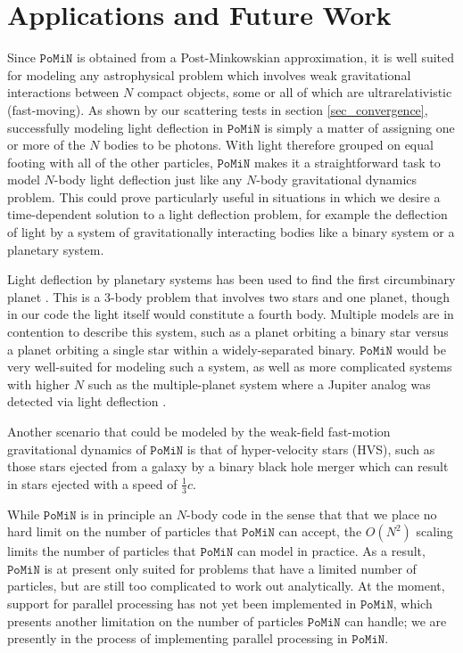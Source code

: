\documentclass[aps,onecolumn,notitlepage,eqsecnum,nofootinbib,floatfix,superscriptaddress]{revtex4-1}
\newcommand{\codename}{\mathtt{PoMiN}}
\begin{document}
\section{Applications and Future Work}
Since $\codename$ is obtained from a Post-Minkowskian approximation, it is well suited for modeling any astrophysical problem which involves weak gravitational interactions between $N$ compact objects, some or all of which are ultrarelativistic (fast-moving). As shown by our scattering tests in section \ref{sec_convergence}, successfully modeling light deflection in $\codename$ is simply a matter of assigning one or more of the $N$ bodies to be photons.  With light therefore grouped on equal footing with all of the other particles, $\codename$ makes it a straightforward task to model $N$-body light deflection just like any $N$-body gravitational dynamics problem.  This could prove particularly useful in situations in which we desire a time-dependent solution to a light deflection problem, for example the deflection of light by a system of gravitationally interacting bodies like a binary system or a planetary system.  

Light deflection by planetary systems has been used to find the first circumbinary planet \cite{circumbinary_planet}.  This is a 3-body problem that involves two stars and one planet, though in our code the light itself would constitute a fourth body.  Multiple models are in contention to describe this system, such as a planet orbiting a binary star versus a planet orbiting a single star within a widely-separated binary.  $\codename$ would be very well-suited for modeling such a system, as well as more complicated systems with higher $N$ such as the multiple-planet system where a Jupiter analog was detected via light deflection \cite{Jupiter_microlensing}.

Another scenario that could be modeled by the weak-field fast-motion gravitational dynamics of $\codename$ is that of hyper-velocity stars (HVS), such as those stars ejected from a galaxy by a binary black hole merger which can result in stars ejected with a speed of $\frac{1}{3} c$.  \cite{Loeb1} \cite{Loeb2} 

While $\codename$ is in principle an $N$-body code in the sense that that we place no hard limit on the number of particles that $\codename$ can accept, the $O(N^2)$ scaling limits the number of particles that $\codename$ can model in practice. As a result, $\codename$ is at present only suited for problems that have a limited number of particles, but are still too complicated to work out analytically. At the moment, support for parallel processing has not yet been implemented in $\codename$, which presents another limitation on the number of particles $\codename$ can handle; we are presently in the process of implementing parallel processing in $\codename$. 
\end{document}
